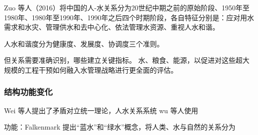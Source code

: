 Zuo 等人（2016）将中国的人-水关系分为20世纪中期之前的原始阶段、1950年至1980年、1980年至1990年、1990年之后四个时期阶段，各自特征分别是：应对用水需求和水灾、管理供水和去中心化、依法管理水资源、重视人水和谐\cite{zuo2016a}。

人水和谐度分为健康度、发展度、协调度三个准则\cite{zuo2008}。

但关系需要准确识别，哪些建立关键指标。
水、粮食、能源，以促进对这些超大规模的工程干预如何融入水管理战略进行更全面的评估。
\cite{rollason2021}

\subsubsection*{结构功能变化}

Wei 等人提出了矛盾对立统一理论，人水关系系统
wu 等人使用

功能：Falkenmark 提出“蓝水”和“绿水”概念，将人类、水与自然的关系分为